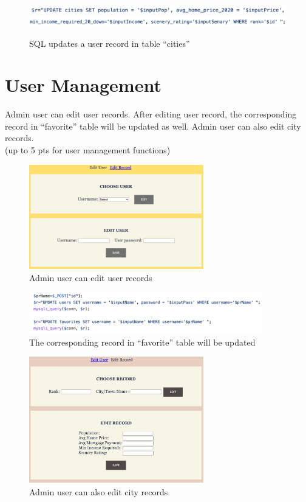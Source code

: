 \documentclass[12pt, letterpaper]{article}
\begin{document}
 \begin{figure}[htbp]
	\centering
	\includegraphics[width=6in]{images/q16-3.png}
	\includegraphics[width=6in]{images/q16-4.png}
	\caption{SQL updates a user record in table “cities” }
 \end{figure}

 \newpage

\section{User Management}
Admin user can edit user records. After editing user record, the corresponding record in “favorite” table will be updated as well.  Admin user can also edit city records.
\\(up to 5 pts for user management functions)

\begin{figure}[htbp]
	\centering
	\includegraphics[width=3in]{images/q17-1.png}
	\caption{Admin user can edit user records}
 \end{figure}
 
 \begin{figure}[htbp]
	\centering
	\includegraphics[width=4in]{images/q17-2.png}
	\caption{The corresponding record in “favorite” table will be updated}
 \end{figure}
 
 \begin{figure}[htbp]
	\centering
	\includegraphics[width=3in]{images/q17-3.png}
	\caption{Admin user can also edit city records}
 \end{figure}
\end{document}
